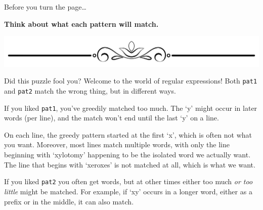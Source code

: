 \begin{Shaded}
\begin{Highlighting}[]
\OperatorTok{=}
\end{Highlighting}
\end{Shaded}

Before you turn the page\ldots{}

\textbf{Think about what each pattern will match.}

\includegraphics{images/Elegant-Flourish-Frame-Extrapolated-19.svg}

\newpage

Did this puzzle fool you? Welcome to the world of regular expressions!
Both \texttt{pat1} and \texttt{pat2} match the wrong thing, but in
different ways.

If you liked \texttt{pat1}, you've greedily matched too much. The `y'
might occur in later words (per line), and the match won't end until the
last `y' on a line.

\begin{Shaded}
\begin{Highlighting}[]
\OperatorTok{\textgreater{}\textgreater{}\textgreater{}} 
\end{Highlighting}
\end{Shaded}

On each line, the greedy pattern started at the first `x', which is
often not what you want. Moreover, most lines match multiple words, with
only the line beginning with `xylotomy' happening to be the isolated
word we actually want. The line that begins with `xeroxes' is not
matched at all, which is what we want.

If you liked \texttt{pat2} you often get words, but at other times
either too much \emph{or too little} might be matched. For example, if
`xy' occurs in a longer word, either as a prefix or in the middle, it
can also match.

